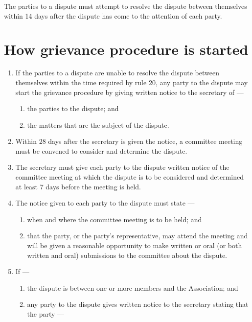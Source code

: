 The parties to a dispute must attempt to resolve the dispute between themselves within 14 days after the dispute has come to the attention of each party.

\hypertarget{how-grievance-procedure-is-started}{%
\section{How grievance procedure is started}\label{how-grievance-procedure-is-started}}

\begin{enumerate}

\item If the parties to a dispute are unable to resolve the dispute between themselves within the time required by rule 20, any party to the dispute may start the grievance procedure by giving written notice to the secretary of ---

  \begin{enumerate}
  
  \item the parties to the dispute; and
  \item the matters that are the subject of the dispute.
  \end{enumerate}
\item Within 28 days after the secretary is given the notice, a committee meeting must be convened to consider and determine the dispute.
\item The secretary must give each party to the dispute written notice of the committee meeting at which the dispute is to be considered and determined at least 7 days before the meeting is held.
\item The notice given to each party to the dispute must state ---

  \begin{enumerate}
  
  \item when and where the committee meeting is to be held; and
  \item that the party, or the party's representative, may attend the meeting and will be given a reasonable opportunity to make written or oral (or both written and oral) submissions to the committee about the dispute.
  \end{enumerate}
\item If ---

  \begin{enumerate}
  
  \item the dispute is between one or more members and the Association; and
  \item any party to the dispute gives written notice to the secretary stating that the party ---


\end{enumerate}
\end{enumerate}
